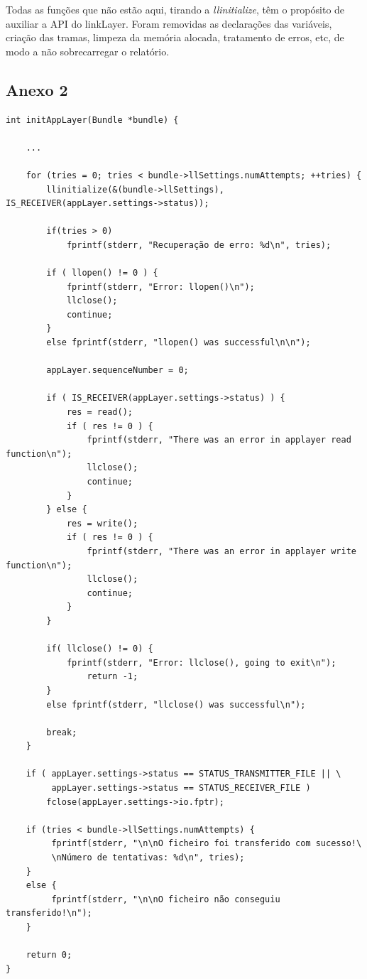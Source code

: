 \documentclass[a4paper]{article}
\begin{document}
Todas as funções que não estão aqui, tirando a \textit{llinitialize}, têm o
propósito de auxiliar a API do linkLayer. Foram removidas as declarações das
variáveis, criação das tramas, limpeza da memória alocada, tratamento de erros,
etc, de modo a não sobrecarregar o relatório.

\subsection*{Anexo 2}
\begin{verbatim}
int initAppLayer(Bundle *bundle) {

    ...

    for (tries = 0; tries < bundle->llSettings.numAttempts; ++tries) {
        llinitialize(&(bundle->llSettings), IS_RECEIVER(appLayer.settings->status));

        if(tries > 0)
            fprintf(stderr, "Recuperação de erro: %d\n", tries);

        if ( llopen() != 0 ) {
            fprintf(stderr, "Error: llopen()\n");
            llclose();
            continue;
        }
        else fprintf(stderr, "llopen() was successful\n\n");

        appLayer.sequenceNumber = 0;

        if ( IS_RECEIVER(appLayer.settings->status) ) {
            res = read();
            if ( res != 0 ) {
                fprintf(stderr, "There was an error in applayer read function\n");
                llclose();
                continue;
            }
        } else {
            res = write();
            if ( res != 0 ) {
                fprintf(stderr, "There was an error in applayer write function\n");
                llclose();
                continue;
            }
        }

        if( llclose() != 0) {
            fprintf(stderr, "Error: llclose(), going to exit\n");
                return -1;
        }
        else fprintf(stderr, "llclose() was successful\n");

        break;
    }

    if ( appLayer.settings->status == STATUS_TRANSMITTER_FILE || \
         appLayer.settings->status == STATUS_RECEIVER_FILE )
        fclose(appLayer.settings->io.fptr);

    if (tries < bundle->llSettings.numAttempts) {
         fprintf(stderr, "\n\nO ficheiro foi transferido com sucesso!\
         \nNúmero de tentativas: %d\n", tries);
    }
    else {
         fprintf(stderr, "\n\nO ficheiro não conseguiu transferido!\n");
    }

    return 0;
}
\end{verbatim}
\end{document}
